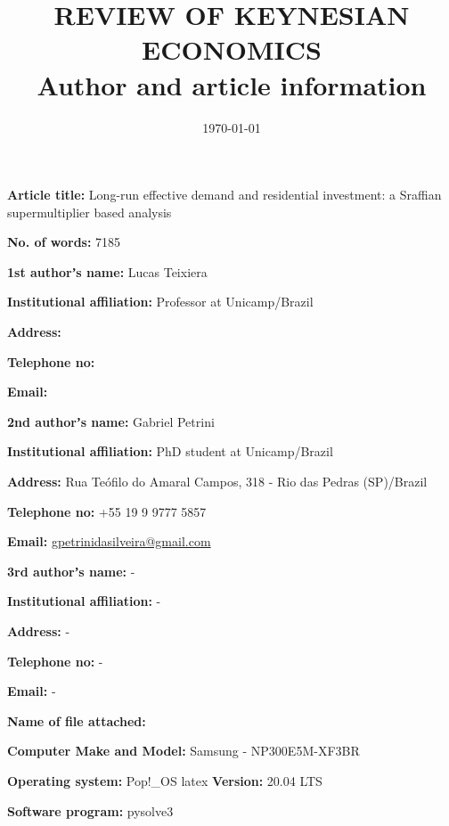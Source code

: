 \documentclass[11pt]{article}
\date{\today}
\title{REVIEW OF KEYNESIAN ECONOMICS\\\medskip
\large Author and article information}
\begin{document}
\maketitle

\textbf{Article title:} Long-run effective demand and residential investment: a Sraffian supermultiplier based analysis

\textbf{No. of words:} 7185

\textbf{1st authorʼs name:} Lucas Teixiera

\textbf{Institutional affiliation:} Professor at Unicamp/Brazil

\textbf{Address:}

\textbf{Telephone no:}

\textbf{Email:}



\textbf{2nd authorʼs name:} Gabriel Petrini

\textbf{Institutional affiliation:} PhD student at Unicamp/Brazil

\textbf{Address:} Rua Teófilo do Amaral Campos, 318 - Rio das Pedras (SP)/Brazil

\textbf{Telephone no:} +55 19 9 9777 5857

\textbf{Email:} \url{gpetrinidasilveira@gmail.com}

\textbf{3rd authorʼs name:} -

\textbf{Institutional affiliation:} -

\textbf{Address:} -

\textbf{Telephone no:} -

\textbf{Email:} -

\textbf{Name of file attached:}

\textbf{Computer Make and Model:} Samsung - NP300E5M-XF3BR

\textbf{Operating system:} Pop!\_OS  \hspace{3cm} latex \textbf{Version:} 20.04 LTS

\textbf{Software program:} pysolve3
\end{document}
